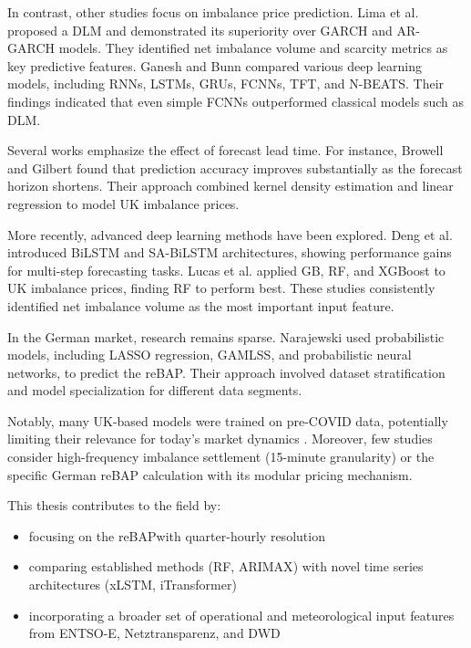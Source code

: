 \documentclass[class=scrbook, crop=false]{standalone}
\begin{document}
In contrast, other studies focus on imbalance price prediction. Lima et al. \cite{limaBayesianPredictiveDistributions2023} proposed a \gls{DLM} and demonstrated its superiority over GARCH and AR-GARCH models. They identified net imbalance volume and scarcity metrics as key predictive features. Ganesh and Bunn  \cite{ganeshForecastingImbalancePrice2024} compared various deep learning models, including RNNs, LSTMs, GRUs, FCNNs, \gls{TFT}, and N-BEATS. Their findings indicated that even simple FCNNs outperformed classical models such as \gls{DLM}.

Several works emphasize the effect of forecast lead time. For instance, Browell and Gilbert \cite{browellPredictingElectricityImbalance2022} found that prediction accuracy improves substantially as the forecast horizon shortens. Their approach combined kernel density estimation and linear regression to model UK imbalance prices.

More recently, advanced deep learning methods have been explored. Deng et al. \cite{dengSeasonalityDeepLearning2024} introduced BiLSTM and SA-BiLSTM architectures, showing performance gains for multi-step forecasting tasks. Lucas et al. \cite{lucasPriceForecastingBalancing2020} applied \gls{GB}, \gls{RF}, and XGBoost to UK imbalance prices, finding \gls{RF} to perform best. These studies consistently identified net imbalance volume as the most important input feature.

In the German market, research remains sparse. Narajewski \cite{narajewskiProbabilisticForecastingGerman2022} used probabilistic models, including LASSO regression, GAMLSS, and probabilistic neural networks, to predict the reBAP. Their approach involved dataset stratification and model specialization for different data segments.

Notably, many UK-based models were trained on pre-COVID data, potentially limiting their relevance for today’s market dynamics  \cite{abadieEnergyMarketPrices2021}. Moreover, few studies consider high-frequency imbalance settlement (15-minute granularity) or the specific German reBAP calculation with its modular pricing mechanism.

This thesis contributes to the field by:
\begin{itemize}
\item focusing on the \gls{reBAP}with quarter-hourly resolution
\item comparing established methods (\gls{RF}, \gls{ARIMAX}) with novel time series architectures (xLSTM, iTransformer)
\item incorporating a broader set of operational and meteorological input features from ENTSO-E, Netztransparenz, and DWD
\end{itemize}
\end{document}
